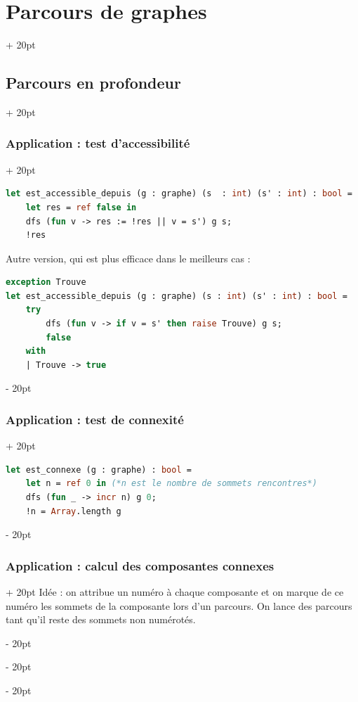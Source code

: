 \documentclass[a4paper, 12pt, twoside]{article}
\newcommand{\ind}[1][20pt]{\advance\leftskip + #1}
\newcommand{\deind}[1][20pt]{\advance\leftskip - #1}
\newenvironment{indt}[2][20pt]{#2 \par \ind[#1]}{\par \deind} %
\begin{document}
\begin{indt}{\section{Parcours de graphes}}
\begin{indt}{\subsection{Parcours en profondeur}}
            \vspace{12pt}
            
            \begin{indt}{\subsubsection{Application : test d'accessibilité}}
                \begin{lstlisting}[language=Caml, xleftmargin=80pt]
let est_accessible_depuis (g : graphe) (s  : int) (s' : int) : bool =
    let res = ref false in
    dfs (fun v -> res := !res || v = s') g s;
    !res\end{lstlisting}

                Autre version, qui est plus efficace dans le meilleurs cas :

                \begin{lstlisting}[language=Caml, xleftmargin=80pt]
exception Trouve
let est_accessible_depuis (g : graphe) (s : int) (s' : int) : bool =
    try
        dfs (fun v -> if v = s' then raise Trouve) g s;
        false
    with
    | Trouve -> true\end{lstlisting}
            \end{indt}

            \vspace{12pt}
            
            \begin{indt}{\subsubsection{Application : test de connexité}}
                \begin{lstlisting}[language=Caml, xleftmargin=80pt]
let est_connexe (g : graphe) : bool =
    let n = ref 0 in (*n est le nombre de sommets rencontres*)
    dfs (fun _ -> incr n) g 0;
    !n = Array.length g\end{lstlisting}
            \end{indt}

            \vspace{12pt}
            
            \begin{indt}{\subsubsection{Application : calcul des composantes connexes}}
                Idée : on attribue un numéro à chaque composante et on marque de ce numéro les sommets de la composante lors d'un parcours. On lance des parcours tant qu'il reste des sommets non numérotés.


\end{indt}
\end{indt}
\end{indt}
\end{document}
